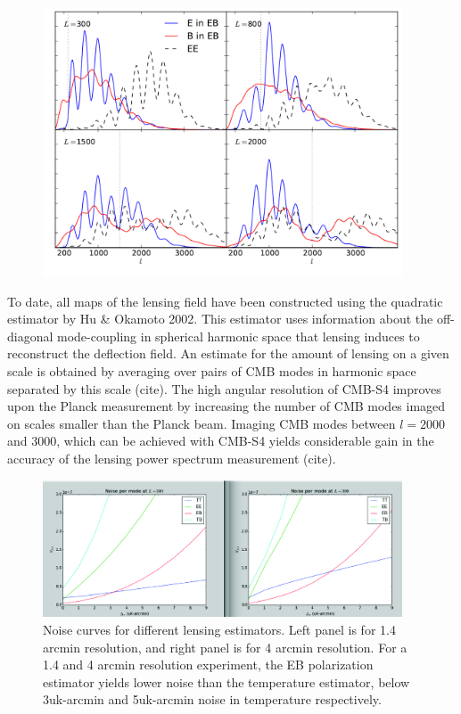 \begin{figure}[h]
\includegraphics[width=0.95\textwidth]{CMBLensing/signal_contribs.pdf}
\caption{}
\end{figure}

To date, all maps of the lensing field have been constructed using the quadratic estimator by Hu \& Okamoto 2002.  This estimator uses information about the off-diagonal mode-coupling in spherical harmonic space that lensing induces to reconstruct the deflection field.  An estimate for the amount of lensing on a given scale is obtained by averaging over pairs of CMB modes in harmonic space separated by this scale (cite).  The high angular resolution of CMB-S4 improves upon the Planck measurement by increasing the number of CMB modes imaged on scales smaller than the Planck beam.  Imaging CMB modes between $l=2000$ and 3000, which can be achieved with CMB-S4 yields considerable gain in the accuracy of the lensing power spectrum measurement (cite).    

\begin{figure}[h]
\includegraphics[width=0.95\textwidth]{CMBLensing/Crossover.png}
\caption{Noise curves for different lensing estimators.  Left panel is for 1.4 arcmin resolution, and right panel is for 4 arcmin resolution.  For a 1.4 and 4 arcmin resolution experiment, the EB polarization estimator yields lower noise than the temperature estimator, below 3uk-arcmin and 5uk-arcmin noise in temperature respectively.}
\end{figure}

